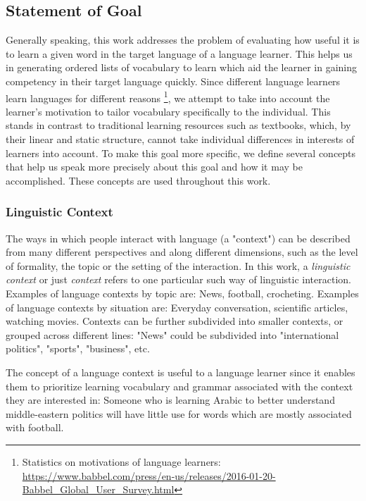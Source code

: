 \subsection{Statement of Goal} \label{sec:statement-of-goal}
Generally speaking, this work addresses the problem of evaluating how useful it is to learn a given word in the target language of a language learner.
This helps us in generating ordered lists of vocabulary to learn which aid the learner in gaining competency in their target language quickly.
Since different language learners learn languages for different reasons \footnote{Statistics on motivations of language learners: \url{https://www.babbel.com/press/en-us/releases/2016-01-20-Babbel_Global_User_Survey.html}}, we attempt to take into account the learner's motivation to tailor vocabulary specifically to the individual.
This stands in contrast to traditional learning resources such as textbooks, which, by their linear and static structure, cannot take individual differences in interests of learners into account.
To make this goal more specific, we define several concepts that help us speak more precisely about this goal and how it may be accomplished.
These concepts are used throughout this work.

\subsubsection{Linguistic Context}
The ways in which people interact with language (a "context") can be described from many different perspectives and along different dimensions, such as the level of formality, the topic or the setting of the interaction.
In this work, a \textit{linguistic context} or just \textit{context} refers to one particular such way of linguistic interaction.
Examples of language contexts by topic are:
News, football, crocheting.
Examples of language contexts by situation are:
Everyday conversation, scientific articles, watching movies.
Contexts can be further subdivided into smaller contexts, or grouped across different lines:
"News" could be subdivided into "international politics", "sports", "business", etc.

The concept of a language context is useful to a language learner since it enables them to prioritize learning vocabulary and grammar associated with the context they are interested in:
Someone who is learning Arabic to better understand middle-eastern politics will have little use for words which are mostly associated with football.

